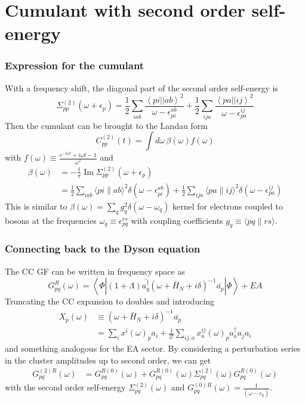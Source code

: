 
\section{Cumulant with second order self-energy}



\begin{frame}
    \frametitle{Expression for the cumulant}
With a frequency shift, the diagonal part of the second order self-energy is
\begin{equation}
    \Sigma_{pp}^{(2)}(\omega+\epsilon_p) =
\frac{1}{2} \sum_{iab}
\frac{\left< pi \left| \right| ab \right>^2}
{\omega-\epsilon_{pi}^{ab}} + \frac{1}{2} \sum_{ija}
\frac{\left< pa \left| \right| ij \right>^2}
{\omega-\epsilon_{pa}^{ij}}
\end{equation}
Then the cumulant can be brought to the Landau form
\begin{equation}
    C_{pp}^{(2)}(t) = \int d\omega\, \beta(\omega) f(\omega)
\end{equation}
with $f(\omega) \equiv \frac{e^{-i \omega t}+i \omega t-1}{\omega^2} $ and
\begin{align}
    \beta(\omega) &= -\frac{1}{\pi} \operatorname{Im} \Sigma_{pp}^{(2)}\left(\omega+\epsilon_p\right) 
\label{eq:beta_def}\\
&=\frac{1}{2} \sum_{i a b}\langle p i \| a b\rangle^2 \delta\left(\omega-\epsilon_{p i}^{a b}\right)+\frac{1}{2} \sum_{i j a}\langle p a \| i j\rangle^2 \delta\left(\omega-\epsilon_{p a}^{i j}\right) \label{eq:beta_2nd}
\end{align}
This is similar to $\beta(\omega)=\sum_q g_q^2 \delta(\omega-\omega_q)$ kernel for electrons coupled to
bosons at the frequencies $\omega_q\equiv \epsilon_{pq}^{rs}$
with coupling coefficients $g_q \equiv \langle p q \| r s\rangle$.
\end{frame}
\begin{frame}
    \frametitle{Connecting back to the Dyson equation}
The CC GF can be written in frequency space as
\begin{equation}
    G_{pq}^R (\omega) = \left\langle \Phi \left| (1+\Lambda) \bar{a^{\dagger}_q}(\omega + \bar{H}_N + i\delta)^{-1} \bar{a_p} \right| \Phi \right\rangle + EA
\end{equation}
Truncating the CC expansion to doubles and introducing
\begin{align}
    X_p(\omega) & \equiv (\omega + \bar{H}_N + i\delta)^{-1} \bar{a_p} \\
& =\sum_i x^i(\omega)_p a_i+\frac{1}{2!} \sum_{ij, a} x_a^{ij}(\omega)_p a_a^{\dagger} a_j a_i
\end{align}
and something analogous for the EA sector. By considering a perturbation series in the cluster amplitudes up to second order, we can get
\begin{align}
    G_{pq}^{(2)R}(\omega)
&= G_{pq}^{R(0)} (\omega) + G_{pq}^{R(0)} (\omega) \Sigma_{pq}^{(2)}(\omega) G_{pq}^{R(0)} (\omega)
\end{align}
with the second order self-energy $\Sigma_{pq}^{(2)}(\omega)$ and $G_{pq}^{(0) R}(\omega)= \frac{1}{(\omega-\epsilon_q)}$.
\end{frame}

